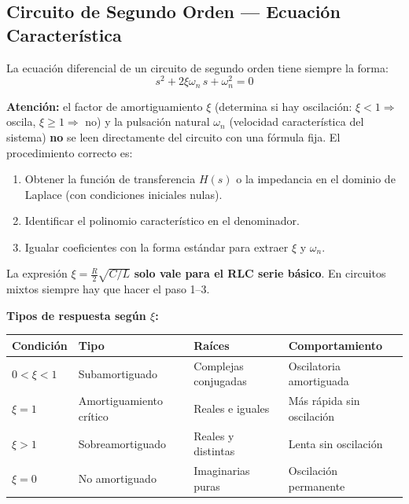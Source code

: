 \documentclass[12pt,a4paper]{article}
\begin{document}
\subsection{Circuito de Segundo Orden — Ecuación Característica}

La ecuación diferencial de un circuito de segundo orden tiene siempre la forma:
\[
  s^2 + 2\xi\omega_n\,s + \omega_n^2 = 0
\]

\begin{warnbox}
\textbf{\color{warnorangeline}Atención:} el factor de amortiguamiento $\xi$ (determina si hay oscilación: $\xi < 1 \Rightarrow$ oscila, $\xi \geq 1 \Rightarrow$ no) y la pulsación natural $\omega_n$ (velocidad característica del sistema) \textbf{no} se leen
directamente del circuito con una fórmula fija. El procedimiento correcto es:
\begin{enumerate}[leftmargin=1.5em, itemsep=3pt]
  \item Obtener la función de transferencia $H(s)$ o la impedancia en el dominio de
        Laplace (con condiciones iniciales nulas).
  \item Identificar el polinomio característico en el denominador.
  \item Igualar coeficientes con la forma estándar para extraer $\xi$ y $\omega_n$.
\end{enumerate}
La expresión $\xi = \tfrac{R}{2}\sqrt{C/L}$ \textbf{solo vale para el RLC serie básico}.
En circuitos mixtos siempre hay que hacer el paso 1--3.
\end{warnbox}

\medskip
\textbf{Tipos de respuesta según $\xi$:}

\begin{center}
\renewcommand{\arraystretch}{1.4}
\begin{tabular}{llll}
\toprule
\textbf{Condición} & \textbf{Tipo} & \textbf{Raíces} & \textbf{Comportamiento}\\
\midrule
$0 < \xi < 1$ & Subamortiguado    & Complejas conjugadas & Oscilatoria amortiguada\\
$\xi = 1$     & Amortiguamiento crítico & Reales e iguales & Más rápida sin oscilación\\
$\xi > 1$     & Sobreamortiguado  & Reales y distintas   & Lenta sin oscilación\\
$\xi = 0$     & No amortiguado    & Imaginarias puras    & Oscilación permanente\\
\bottomrule
\end{tabular}
\end{center}
\end{document}
